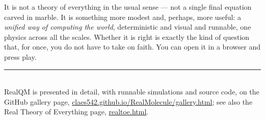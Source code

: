 \documentclass[11pt]{article}
\begin{document}
It is not a theory of everything in the usual sense --- not a single final equation carved in
marble. It is something more modest and, perhaps, more useful: a \emph{unified way of computing the
world}, deterministic and visual and runnable, one physics across all the scales. Whether it is
right is exactly the kind of question that, for once, you do not have to take on faith. You can open
it in a browser and press play.

\vfill
\noindent\rule{0.4\textwidth}{0.4pt}\\[0.4em]
\small RealQM is presented in detail, with runnable simulations and source code, on the GitHub
gallery page,
\href{https://claes542.github.io/RealMolecule/gallery.html}{claes542.github.io/RealMolecule/gallery.html};
see also the Real Theory of Everything page,
\href{https://claes542.github.io/RealMolecule/realtoe.html}{realtoe.html}.
\end{document}
